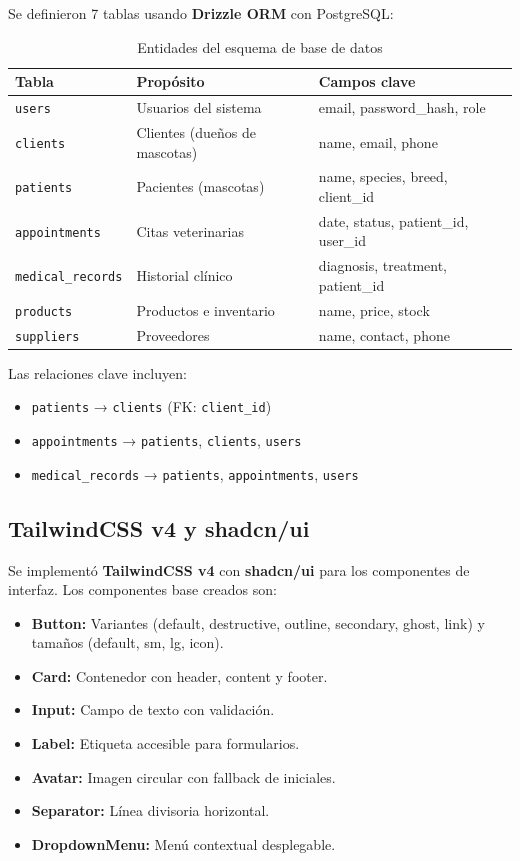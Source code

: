 \documentclass[12pt,a4paper]{article}
\begin{document}
Se definieron 7 tablas usando \textbf{Drizzle ORM} con PostgreSQL:

\begin{table}[h]
\centering
\caption{Entidades del esquema de base de datos}
\begin{tabularx}{\textwidth}{|l|X|l|}
\hline
\textbf{Tabla} & \textbf{Propósito} & \textbf{Campos clave} \\
\hline
\texttt{users} & Usuarios del sistema & email, password\_hash, role \\
\texttt{clients} & Clientes (dueños de mascotas) & name, email, phone \\
\texttt{patients} & Pacientes (mascotas) & name, species, breed, client\_id \\
\texttt{appointments} & Citas veterinarias & date, status, patient\_id, user\_id \\
\texttt{medical\_records} & Historial clínico & diagnosis, treatment, patient\_id \\
\texttt{products} & Productos e inventario & name, price, stock \\
\texttt{suppliers} & Proveedores & name, contact, phone \\
\hline
\end{tabularx}
\end{table}

Las relaciones clave incluyen:

\begin{itemize}[leftmargin=*]
    \item \texttt{patients} → \texttt{clients} (FK: \texttt{client\_id})
    \item \texttt{appointments} → \texttt{patients}, \texttt{clients}, \texttt{users}
    \item \texttt{medical\_records} → \texttt{patients}, \texttt{appointments}, \texttt{users}
\end{itemize}

\subsection{TailwindCSS v4 y shadcn/ui}

Se implementó \textbf{TailwindCSS v4} con \textbf{shadcn/ui} para los componentes
de interfaz. Los componentes base creados son:

\begin{itemize}[leftmargin=*]
    \item \textbf{Button:} Variantes (default, destructive, outline, secondary,
          ghost, link) y tamaños (default, sm, lg, icon).
    \item \textbf{Card:} Contenedor con header, content y footer.
    \item \textbf{Input:} Campo de texto con validación.
    \item \textbf{Label:} Etiqueta accesible para formularios.
    \item \textbf{Avatar:} Imagen circular con fallback de iniciales.
    \item \textbf{Separator:} Línea divisoria horizontal.
    \item \textbf{DropdownMenu:} Menú contextual desplegable.
\end{itemize}
\end{document}
